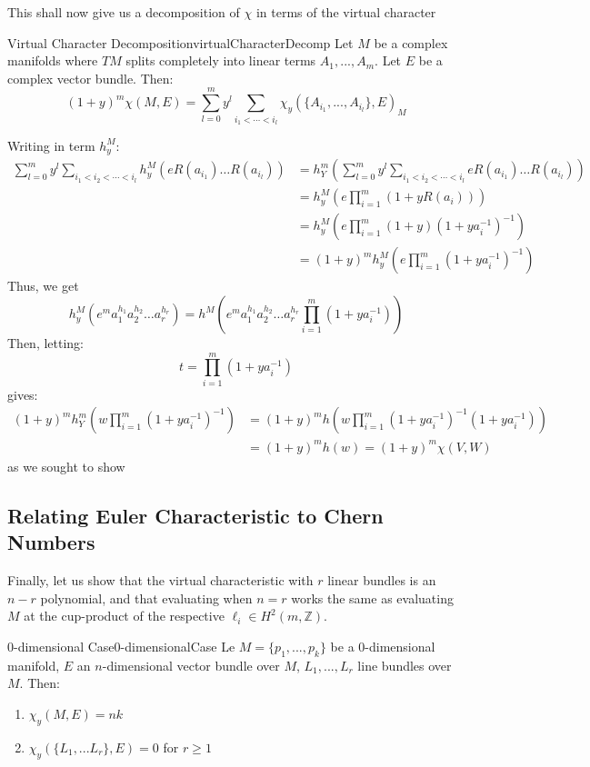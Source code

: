 \documentclass{ut-thesis}
\newenvironment{Proof}[1][]
  {\begin{ProofTcb}[#1]}
  {\end{ProofTcb}}
\newcommand{\Z}{{\mathbb{Z}}}
\begin{document}
This shall now give us a decomposition of $\chi$ in terms of the virtual character

\begin{thm}{Virtual Character Decomposition}{virtualCharacterDecomp}
  Let $M$ be a complex manifolds where $TM$ splits completely into linear terms $A_1, ..., A_m$. Let $E$
  be a complex vector bundle. Then:
  \[
    (1+y)^m \chi(M, E) = \sum_{l=0}^m y^l \sum_{i_1 < \cdots < i_l} \chi_y(\{A_{i_1}, ..., A_{i_l}\}, E)_M
  \]
\end{thm}

\begin{Proof}
    Writing in term $h_y^M$:
  \begin{align*}
      \sum_{l=0}^m y^l \sum_{i_1<i_2<\cdots<i_l} h_y^M(eR(a_{i_1})\ldots R(a_{i_l})) &= h_Y^m\left(\sum_{l=0}^m y^l \sum_{i_1<i_2<\cdots<i_l} eR(a_{i_1})\ldots R(a_{i_l})\right) \\
      &= h_y^M\left(e\prod_{i=1}^m(1+yR(a_i))\right) \\
      &= h_y^M\left(e\prod_{i=1}^m(1+y)(1+ya_i^{-1})^{-1}\right) \\
      &= (1+y)^mh_y^M\left(e\prod_{i=1}^m(1+ya_i^{-1})^{-1}\right)
  \end{align*}
  Thus, we get
  \[
      h_y^M(e^m a_1^{h_1}a_2^{h_2}\ldots a_r^{h_r}) = h^M\left(e^m a_1^{h_1}a_2^{h_2}\ldots a_r^{h_r}\prod_{i=1}^m(1+ya_i^{-1})\right)
  \]
  Then, letting:
  \[
      t = \prod_{i=1}^m(1+ya_i^{-1})
  \]
  gives:
  \begin{align*}
      (1+y)^mh_Y^m\left(w\prod_{i=1}^m(1+ya_i^{-1})^{-1}\right) &= (1+y)^mh\left(w\prod_{i=1}^m(1+ya_i^{-1})^{-1}(1+ya_i^{-1})\right) \\
      &= (1+y)^mh(w) = (1+y)^m\chi(V,W)
  \end{align*}
  as we sought to show
\end{Proof}






\subsection{Relating Euler Characteristic to Chern Numbers}\label{sec:virtualEulerCharOnProjVar}

Finally, let us show that the virtual characteristic with $r$ linear bundles is an $n-r$ polynomial, and that
evaluating when $n=r$ works the same as evaluating $M$ at the cup-product of the respective $\ell_i \in H^2(m
,\Z)$.

\begin{lem}{0-dimensional Case}{0-dimensionalCase}
  Le $M = \{p_1, ..., p_k\}$ be a $0$-dimensional manifold, $E$ an $n$-dimensional vector bundle over $M$, $L_1, ..., L_r$ line
  bundles over $M$. Then:
  \begin{enumerate}
    \item $\chi_y(M, E) = nk$
  \item $\chi_y(\{L_1, ... L_r\}, E) = 0$ for $r \ge 1$
  \end{enumerate}
\end{lem}
\end{document}

